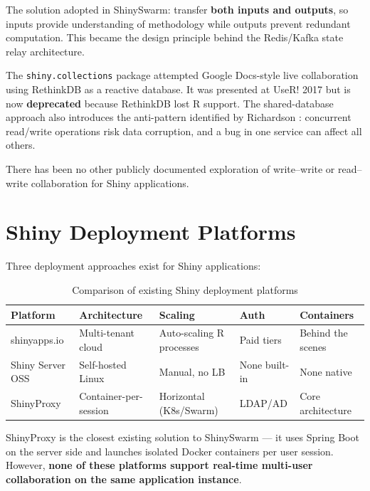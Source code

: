 \documentclass[12pt,a4paper]{article}
\begin{document}
The solution adopted in ShinySwarm: transfer \textbf{both inputs and outputs}, so inputs provide understanding of methodology while outputs prevent redundant computation. This became the design principle behind the Redis/Kafka state relay architecture.

The \texttt{shiny.collections} package \cite{appsilon2017} attempted Google Docs-style live collaboration using RethinkDB \cite{rethinkdb} as a reactive database. It was presented at UseR! 2017 but is now \textbf{deprecated} because RethinkDB lost R support. The shared-database approach also introduces the anti-pattern identified by Richardson \cite{richardson_shared_db}: concurrent read/write operations risk data corruption, and a bug in one service can affect all others.

There has been no other publicly documented exploration of write--write or read--write collaboration for Shiny applications.

\section{Shiny Deployment Platforms}

Three deployment approaches exist for Shiny applications:

\begin{table}[h]
\centering
\small
\begin{tabular}{@{}lllll@{}}
\toprule
\textbf{Platform} & \textbf{Architecture} & \textbf{Scaling} & \textbf{Auth} & \textbf{Containers} \\
\midrule
shinyapps.io \cite{shinyappsio} & Multi-tenant cloud & Auto-scaling R processes & Paid tiers & Behind the scenes \\
Shiny Server OSS \cite{shinyserver} & Self-hosted Linux & Manual, no LB & None built-in & None native \\
ShinyProxy \cite{shinyproxy} & Container-per-session & Horizontal (K8s/Swarm) & LDAP/AD & Core architecture \\
\bottomrule
\end{tabular}
\caption{Comparison of existing Shiny deployment platforms}
\end{table}

ShinyProxy is the closest existing solution to ShinySwarm --- it uses Spring Boot on the server side and launches isolated Docker containers per user session. However, \textbf{none of these platforms support real-time multi-user collaboration on the same application instance}.
\end{document}
